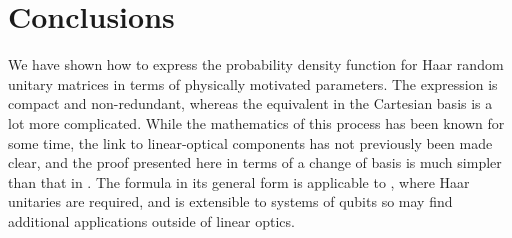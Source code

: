 \section{Conclusions}
\label{sec:DDConclusions}
We have shown how to express the probability density function for Haar random
unitary matrices in terms of physically motivated parameters. The expression is
compact and non-redundant, whereas the equivalent in the Cartesian basis is a
lot more complicated. While the mathematics of this process has been known
for some time, the link to linear-optical components has not previously been
made clear, and the proof presented here in terms of a change of basis is much
simpler than that in \cite{spengler2010}. The formula in its general form
is applicable to \bosonsampling{}, where Haar unitaries are required, and is
extensible to systems of qubits so may find additional applications outside of
linear optics.
